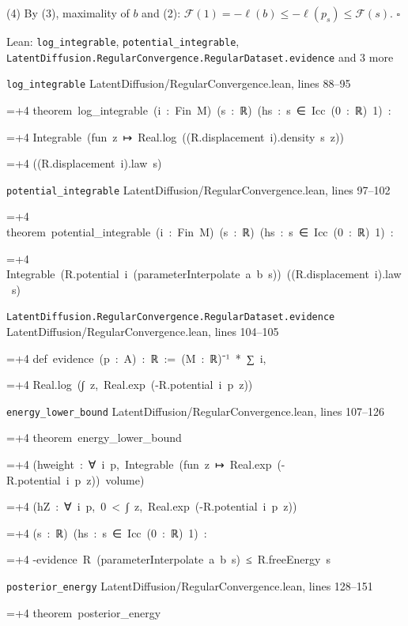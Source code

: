 \documentclass[11pt,a4paper]{report}
\newlength{\leancharwidth}
\newenvironment{leancode}{\par\smallskip\begingroup\ttfamily\footnotesize\raggedright
  \settowidth{\leancharwidth}{M}\setlength{\parskip}{0pt}\setlength{\parindent}{0pt}
  \frenchspacing}{\par\endgroup\smallskip}
\newcommand{\leanline}[2]{\hangindent=\dimexpr#1\leancharwidth+4\leancharwidth\relax
  \hangafter=1\noindent\hspace*{#1\leancharwidth}#2\par}
\newcommand{\leansource}[1]{\par{\footnotesize\color{leanmuted}#1}\par}
\begin{document}
(4) By (3), maximality of \(b\) and (2): \(\mathcal F(1)=-\ell(b)\le-\ell(p_s)\le\mathcal F(s)\). \(\square\)

\begin{leanbox}{Lean: \texttt{log\_\allowbreak{}integrable}, \texttt{potential\_\allowbreak{}integrable}, \texttt{LatentDiffusion.\allowbreak{}RegularConvergence.\allowbreak{}RegularDataset.\allowbreak{}evidence} and 3 more}
\leansource{\texttt{log\_\allowbreak{}integrable} \quad LatentDiffusion/\allowbreak{}RegularConvergence.lean, lines 88–95}
\begin{leancode}
\leanline{0}{theorem\ log\_integrable\ (i\ :\ Fin\ M)\ (s\ :\ ℝ)\ (hs\ :\ s\ ∈\ Icc\ (0\ :\ ℝ)\ 1)\ :}
\leanline{4}{Integrable\ (fun\ z\ ↦\ Real.log\ ((R.displacement\ i).density\ s\ z))}
\leanline{6}{((R.displacement\ i).law\ s)}
\end{leancode}
\leansource{\texttt{potential\_\allowbreak{}integrable} \quad LatentDiffusion/\allowbreak{}RegularConvergence.lean, lines 97–102}
\begin{leancode}
\leanline{0}{theorem\ potential\_integrable\ (i\ :\ Fin\ M)\ (s\ :\ ℝ)\ (hs\ :\ s\ ∈\ Icc\ (0\ :\ ℝ)\ 1)\ :}
\leanline{4}{Integrable\ (R.potential\ i\ (parameterInterpolate\ a\ b\ s))\ ((R.displacement\ i).law\ s)}
\end{leancode}
\leansource{\texttt{LatentDiffusion.\allowbreak{}RegularConvergence.\allowbreak{}RegularDataset.\allowbreak{}evidence} \quad LatentDiffusion/\allowbreak{}RegularConvergence.lean, lines 104–105}
\begin{leancode}
\leanline{0}{def\ evidence\ (p\ :\ A)\ :\ ℝ\ :=\ (M\ :\ ℝ)⁻¹\ *\ ∑\ i,}
\leanline{2}{Real.log\ (∫\ z,\ Real.exp\ (-R.potential\ i\ p\ z))}
\end{leancode}
\leansource{\texttt{energy\_\allowbreak{}lower\_\allowbreak{}bound} \quad LatentDiffusion/\allowbreak{}RegularConvergence.lean, lines 107–126}
\begin{leancode}
\leanline{0}{theorem\ energy\_lower\_bound}
\leanline{4}{(hweight\ :\ ∀\ i\ p,\ Integrable\ (fun\ z\ ↦\ Real.exp\ (-R.potential\ i\ p\ z))\ volume)}
\leanline{4}{(hZ\ :\ ∀\ i\ p,\ 0\ <\ ∫\ z,\ Real.exp\ (-R.potential\ i\ p\ z))}
\leanline{4}{(s\ :\ ℝ)\ (hs\ :\ s\ ∈\ Icc\ (0\ :\ ℝ)\ 1)\ :}
\leanline{4}{-evidence\ R\ (parameterInterpolate\ a\ b\ s)\ ≤\ R.freeEnergy\ s}
\end{leancode}
\leansource{\texttt{posterior\_\allowbreak{}energy} \quad LatentDiffusion/\allowbreak{}RegularConvergence.lean, lines 128–151}
\begin{leancode}
\leanline{0}{theorem\ posterior\_energy}

\end{leancode}
\end{leanbox}
\end{document}
